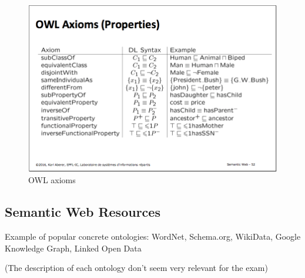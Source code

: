 \begin{figure}[H]
\begin{center}
\includegraphics[width=\textwidth]{figures/owl_axioms.png}
\end{center}
\caption{OWL axioms}
\end{figure}


\subsection{Semantic Web Resources}
Example of popular concrete ontologies: WordNet, Schema.org, WikiData, Google Knowledge Graph, Linked Open Data

(The description of each ontology don't seem very relevant for the exam)